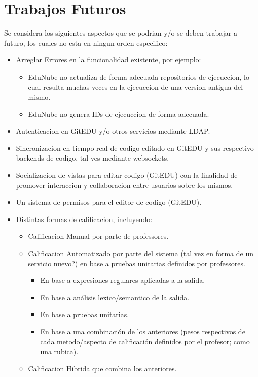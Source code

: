 \section{Trabajos Futuros}
Se considera los siguientes aspectos que se podrian y/o se deben trabajar a futuro, los cuales no esta en ningun orden especifico:
\begin{itemize}
	\item Arreglar Errores en la funcionalidad existente, por ejemplo:
    \begin{itemize}
    	\item EduNube no actualiza de forma adecuada repositorios de ejecuccion, lo cual resulta muchas veces en la ejecuccion de una version antigua del mismo.
        \item EduNube no genera IDs de ejecuccion de forma adecuada.
    \end{itemize}
    \item Autenticacion en GitEDU y/o otros servicios mediante LDAP.
    \item Sincronizacion en tiempo real de codigo editado en GitEDU y sus respectivo backends de codigo, tal ves mediante websockets.
    \item Socializacion de vistas para editar codigo (GitEDU) con la finalidad de promover interaccion y collaboracion entre usuarios sobre los mismos.
    \item Un sistema de permisos para el editor de codigo (GitEDU).
    \item Distintas formas de calificacion, incluyendo:
    \begin{itemize}
    	\item Calificacion Manual por parte de professores.
        \item Calificacion Automatizado por parte del sistema (tal vez en forma de un servicio nuevo?) en base a pruebas unitarias definidos por professores.
        \begin{itemize}
        	\item En base a expresiones regulares aplicadas a la salida.
            \item En base a análisis lexico/semantico de la salida.
            \item En base a pruebas unitarias.
            \item En base a una combinación de los anteriores (pesos respectivos de cada metodo/aspecto de calificación definidos por el profesor; como una rubica).
        \end{itemize}
        \item Calificacion Hibrida que combina los anteriores.

\end{itemize}
\end{itemize}

